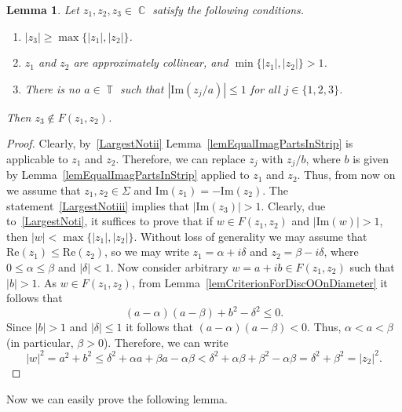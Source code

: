 \documentclass{amsart}
\numberwithin{equation}{section}
\newtheorem{lemma}[theorem]{Lemma}
\theoremstyle{definition}
\theoremstyle{remark}
\DeclareMathOperator{\CC}{\mathbb C}
\DeclareMathOperator{\TT}{\mathbb T}
\begin{document}
	\begin{lemma}\label{lemLargestNotInTheSameStrip}
		Let $z_1, z_2, z_3 \in \CC$ satisfy the following conditions.
		\begin{enumerate}[label=(\roman*)]
			\item\label{LargestNoti}  $|z_3| \ge \max\{|z_1|, |z_2|\}$.
			\item\label{LargestNotii} $z_1$ and $z_2$ are approximately collinear, and $\min\{|z_1|, |z_2|\} > 1$.
			\item\label{LargestNotiii} There is no $a \in \TT$ such that $|\mathrm{Im}(z_j/a)| \le 1$ for all $j \in \{1,2,3\}$.
		\end{enumerate}
		Then $z_3 \notin F(z_1, z_2)$.
	\end{lemma}
	\begin{proof}
		Clearly, by~\ref{LargestNotii} Lemma~\ref{lemEqualImagPartsInStrip} is applicable to $z_1$ and $z_2$. Therefore, we can replace $z_j$ with $z_j/b$, where $b$ is given by Lemma~\ref{lemEqualImagPartsInStrip} applied to $z_1$ and $z_2$. Thus, from now on we assume that $z_1,z_2 \in \Sigma$ and $\mathrm{Im}(z_1) = -\mathrm{Im}(z_2)$. The statement~\ref{LargestNotiii} implies that $|\mathrm{Im}(z_3)| > 1$. Clearly, due to~\ref{LargestNoti}, it suffices to prove that if $w \in F(z_1,z_2)$ and $|\mathrm{Im}(w)| > 1$, then $|w| < \max\{|z_1|, |z_2|\}$. Without loss of generality we may assume that $\mathrm{Re}(z_1) \le \mathrm{Re}(z_2)$, so we may write $z_1 = \alpha+ i\delta$ and $z_2 = \beta - i\delta$, where $0 \le \alpha \le \beta$ and $|\delta| < 1$. Now consider arbitrary $w = a + ib \in F(z_1, z_2)$ such that $|b| > 1$. As $w \in F(z_1,z_2)$, from Lemma~\ref{lemCriterionForDiscOOnDiameter} it follows that 
		\[
		(a - \alpha)(a - \beta) + b^2 - \delta^2 \le 0.
		\]
		Since $|b| > 1$ and $|\delta| \le 1$ it follows that $(a - \alpha)(a - \beta) < 0$. Thus, $\alpha < a < \beta$ (in particular, $\beta > 0$). Therefore, we can write
		\[
		|w|^2 = a^2 + b^2 \le \delta^2 + \alpha a + \beta a - \alpha \beta < \delta^2 + \alpha \beta + \beta^2 - \alpha \beta = \delta^2 + \beta^2 = |z_2|^2.
		\]
	\end{proof}
	
	Now we can easily prove the following lemma.
	
\end{document}
